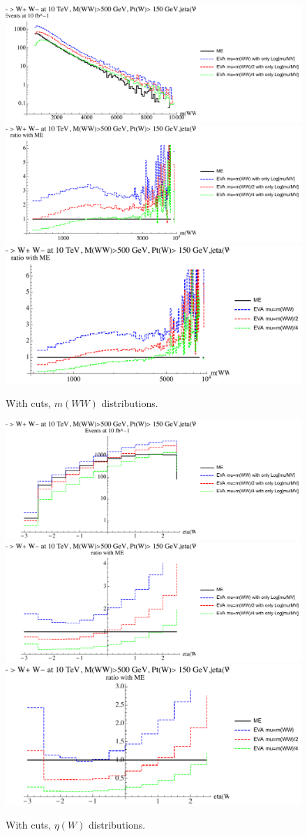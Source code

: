 \documentclass[a4paper,11pt]{article}
\begin{document}
\begin{figure}[!t]
\includegraphics[width=0.46\linewidth]{Notebooks/PlotDistr/WW_WW/10TeVcuts/plotmWW.pdf}
\includegraphics[width=0.46\linewidth]{Notebooks/PlotDistr/WW_WW/10TeVcuts/plotmWWratio1.pdf}
\includegraphics[width=0.46\linewidth]{Notebooks/PlotDistr/WW_WW/10TeVcuts/plotmWWratio2.pdf}
\caption{With cuts, $m(WW)$ distributions. \label{fig:cutsWWWW}}
\end{figure}



\begin{figure}[!t]
\includegraphics[width=0.46\linewidth]{Notebooks/PlotDistr/WW_WW/10TeVcuts/plotetaW.pdf}
\includegraphics[width=0.46\linewidth]{Notebooks/PlotDistr/WW_WW/10TeVcuts/plotetaWratio1.pdf}
\includegraphics[width=0.46\linewidth]{Notebooks/PlotDistr/WW_WW/10TeVcuts/plotetaWratio2.pdf}
\caption{With cuts, $\eta(W)$ distributions. \label{fig:cutsWWWW2}}
\end{figure}
\end{document}
